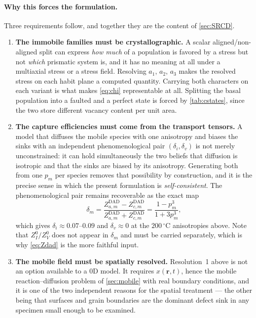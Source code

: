 \documentclass{article}
\newcommand{\Zdad}{Z^{\mathrm{DAD}}}
\begin{document}
\paragraph{Why this forces the formulation.} Three requirements follow, and
together they are the content of \cref{sec:SRCD}.
\begin{enumerate}
\item \textbf{The immobile families must be crystallographic.} A scalar
      aligned/non-aligned split can express \emph{how much} of a population is
      favored by a stress but not \emph{which} prismatic system is, and it has
      no meaning at all under a multiaxial stress or a stress field. Resolving
      $a_1$, $a_2$, $a_3$ makes the resolved stress on each habit plane a
      computed quantity. Carrying both characters on each variant is what makes
      \cref{eq:chi} representable at all. Splitting the basal population into a
      faulted and a perfect state is forced by \cref{tab:cstates}, since the two
      store different vacancy content per unit area.
\item \textbf{The capture efficiencies must come from the transport tensors.}
      A model that diffuses the mobile species with one anisotropy and biases
      the sinks with an independent phenomenological pair $(\delta_i,\delta_v)$
      is not merely unconstrained: it can hold simultaneously the two beliefs
      that diffusion is isotropic and that the sinks are biased by its
      anisotropy. Generating both from one $p_m$ per species removes that
      possibility by construction, and it is the precise sense in which the
      present formulation is \emph{self-consistent}. The phenomenological pair
      remains recoverable as the exact map
      \begin{equation}
        \delta_m=\frac{\Zdad_{a,m}-\Zdad_{c,m}}{\Zdad_{a,m}+\Zdad_{c,m}}
                =\frac{1-p_m^3}{1+3p_m^3},
        \label{eq:deltamap}
      \end{equation}
      which gives $\delta_i\approx0.07$--$0.09$ and $\delta_v\approx0$ at the
      $200\,^\circ$C anisotropies above. Note that $Z^0_I/Z^0_V$ does not appear
      in $\delta_m$ and must be carried separately, which is why \cref{eq:Zdad}
      is the more faithful input.
\item \textbf{The mobile field must be spatially resolved.} Resolution~1 above
      is not an option available to a $0$D model. It requires $x(\bm r,t)$,
      hence the mobile reaction--diffusion problem of \cref{sec:mobile} with real
      boundary conditions, and it is one of the two independent reasons for the
      spatial treatment --- the other being that surfaces and grain boundaries
      are the dominant defect sink in any specimen small enough to be examined.
\end{enumerate}
\end{document}
